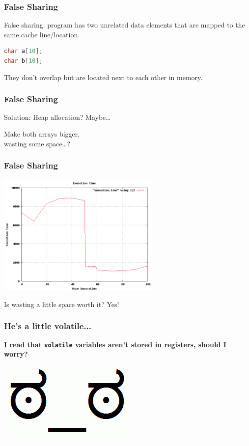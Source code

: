 \begin{frame}[fragile]
\frametitle{False Sharing}
\Large
False sharing: program has two unrelated data elements that are mapped to the same cache line/location.

\begin{lstlisting}[language=C]
char a[10];
char b[10];
\end{lstlisting}

They don't overlap but are located next to each other in memory.

\end{frame}


\begin{frame}
\frametitle{False Sharing}
\Large
Solution: Heap allocation? Maybe\ldots

Make both arrays bigger, \\
wasting some space\ldots?
\end{frame}


\begin{frame}
\frametitle{False Sharing}

\begin{center}
\includegraphics[width=0.6\textwidth]{images/falsesharing.png}
\end{center}
\Large

Is wasting a little space worth it? Yes!
\end{frame}

\begin{frame}[fragile]
  \frametitle{He's a little volatile...}
\Large
  
  {\bf I read that {\tt volatile} variables aren't stored in registers,
     should I worry?}
  \vspace{6.2em}
  \pause

  \begin{center}
    \includegraphics[scale=0.3]{images/disapproval}    
  \end{center}
  
\end{frame}


